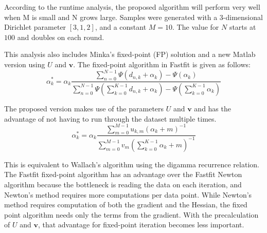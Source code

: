 \documentclass[twoside]{article}
\begin{document}
According to the runtime analysis, the proposed algorithm will perform very well when M is small and N grows large.  Samples were generated with a 3-dimensional Dirichlet parameter $[3,1,2]$, and a constant $M = 10$.  The value for $N$ starts at $100$ and doubles on each round.

This analysis also includes Minka's fixed-point (FP) solution and a new Matlab version using $U$ and $\mathbf{v}$.  The fixed-point algorithm in Fastfit is given as follows:
\begin{equation}
\alpha_k^{*}= \alpha_k\frac{\sum_{n=0}^{N-1}\Psi(d_{n,k}+\alpha_k)-\Psi(\alpha_k)}{\sum_{n=0}^{N-1}\Psi(\sum_{k=0}^{K-1}d_{n,k}+\alpha_k)-\Psi(\sum_{k=0}^{K-1}\alpha_k)}
\end{equation}

The proposed version makes use of the parameters $U$ and $\mathbf{v}$ and has the advantage of not having to run through the dataset multiple times.
\begin{equation}
\alpha_k^{*}= \alpha_k\frac{\sum_{m=0}^{M-1}u_{k,m}(\alpha_k+m)^{-1}}{\sum_{m=0}^{M-1}v_m(\sum_{k=0}^{K-1}\alpha_k+m)^{-1}}
\end{equation}

This is equivalent to Wallach's algorithm using the digamma recurrence relation\cite{wallach}. The Fastfit fixed-point algorithm has an advantage over the Fastfit Newton algorithm because the bottleneck is reading the data on each iteration, and Newton's method requires more computations per data point.  While Newton's method requires computation of both the gradient and the Hessian, the fixed point algorithm needs only the terms from the gradient.  With the precalculation of $U$ and $\mathbf{v}$, that advantage for fixed-point iteration becomes less important.
\end{document}
